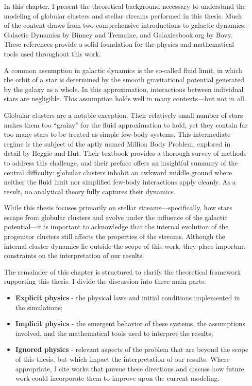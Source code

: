 In this chapter, I present the theoretical background necessary to understand the modeling of globular clusters and stellar streams performed in this thesis. Much of the content draws from two comprehensive introductions to galactic dynamics: Galactic Dynamics by Binney and Tremaine, and Galaxiesbook.org by Bovy. These references provide a solid foundation for the physics and mathematical tools used throughout this work.

A common assumption in galactic dynamics is the so-called fluid limit, in which the orbit of a star is determined by the smooth gravitational potential generated by the galaxy as a whole. In this approximation, interactions between individual stars are negligible. This assumption holds well in many contexts—but not in all.

Globular clusters are a notable exception. Their relatively small number of stars makes them too “grainy” for the fluid approximation to hold, yet they contain far too many stars to be treated as simple few-body systems. This intermediate regime is the subject of the aptly named Million Body Problem, explored in detail by Heggie and Hut. Their textbook provides a thorough survey of methods to address this challenge, and their preface offers an insightful summary of the central difficulty: globular clusters inhabit an awkward middle ground where neither the fluid limit nor simplified few-body interactions apply cleanly. As a result, no analytical theory fully captures their dynamics.

While this thesis focuses primarily on stellar streams—specifically, how stars escape from globular clusters and evolve under the influence of the galactic potential—it is important to acknowledge that the internal evolution of the progenitor clusters still affects the properties of the streams. Although the internal cluster dynamics lie outside the scope of this work, they place important constraints on the interpretation of our results.

The remainder of this chapter is structured to clarify the theoretical framework supporting this thesis. I divide the discussion into three main parts:

\begin{itemize}

    \item \textbf{Explicit physics} - the physical laws and initial conditions implemented in the simulations;



    \item \textbf{Implicit physics} - the emergent behavior of these systems, the assumptions involved, and the mathematical tools used to interpret the results;

    \item \textbf{Ignored physics} - relevant aspects of the problem that are beyond the scope of this thesis, but which impact the interpretation of our results. Where appropriate, I cite works that pursue these directions and discuss how future work could incorporate them to improve upon the current modeling.


\end{itemize}




